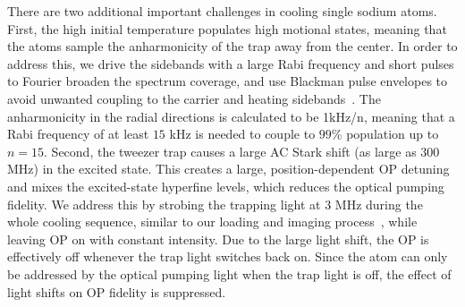 \documentclass[aps,prl,twocolumn,groupedaddress]{revtex4-1}
\begin{document}
There are two additional important challenges in cooling single sodium atoms.
First, the high initial temperature populates high motional states,
meaning that the atoms sample the anharmonicity of the trap away from the center.
In order to address this, we drive the sidebands with a large Rabi frequency
and short pulses to Fourier broaden the spectrum coverage, and use Blackman pulse envelopes
to avoid unwanted coupling to the carrier and heating sidebands~\cite{Kasevich1992}.
The anharmonicity in the radial directions is calculated to be 1kHz/n, meaning that a
Rabi frequency of at least $15$ kHz is needed to couple to $99$\% population up to $n=15$.
Second, the tweezer trap causes a large AC Stark shift (as large as $300$ MHz)
in the excited state. This creates a large, position-dependent OP detuning
and mixes the excited-state hyperfine levels, which reduces the optical pumping fidelity.
We address this by strobing the trapping light at 3 MHz during the whole cooling sequence,
similar to our loading and imaging process~\cite{Hutzler2017-LightShifts},
while leaving OP on with constant intensity.
Due to the large light shift, the OP is effectively off whenever the trap light switches back on.
Since the atom can only be addressed by the optical pumping light when the trap light is off,
the effect of light shifts on OP fidelity is suppressed.
\end{document}
